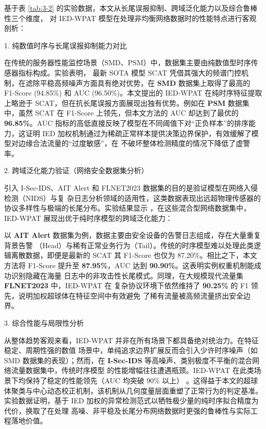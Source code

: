 基于表 \ref{tab:3-2} 的实验数据，本文从长尾误报抑制、跨域泛化能力以及综合鲁棒性三个维度，
对 IED-WPAT 模型在处理非均衡网络数据时的性能特点进行客观剖析：

1. 纯数值时序与长尾误报抑制能力对比

在传统的服务器性能监控场景（SMD、PSM）中，数据集主要由纯数值型时序传感器指标构成。实验表明，
最新 SOTA 模型 SCAT 凭借其强大的频谱门控机制，在滤除平稳高频噪声方面具有绝对优势，在 
\textbf{SMD} 数据集上取得了最高的 F1-Score (94.85\%) 和 AUC (96.50\%)。本文提出的 
IED-WPAT 在纯时序特征提取上略逊于 SCAT，但在抗长尾误报方面展现出独有优势。例如在
\textbf{PSM} 数据集中，虽然 SCAT 在 F1-Score 上领先，但本文方法的 AUC 却达到了最优的 
\textbf{96.85\%}。AUC 指标的高低直接反映了模型在不同阈值下对“正负样本”的排序能力，这证明 
IED 加权机制通过为稀疏正常样本提供决策边界保护，有效缓解了模型对边缘合法流量的“过度敏感”，在
不破坏整体检测精度的情况下降低了虚警率。

2. 跨域泛化能力验证（网络安全数据集分析）

引入 I-Sec-IDS、AIT Alert 和 FLNET2023 数据集的目的是验证模型在网络入侵检测（NIDS）与复
杂日志分析领域的适用性，这类数据表现出远超物理传感器的协议多样性与极端的长尾分布。实验结果显示
，在这些混合型网络数据集中，IED-WPAT 展现出优于纯时序模型的跨域泛化能力：

以 \textbf{AIT Alert} 数据集为例，数据主要由安全设备的告警日志组成，存在大量重复背景告警
（Head）与稀有正常业务行为（Tail）。传统的时序模型难以处理此类逻辑离散数据，即便是最新的 
SCAT 其 F1-Score 也仅为 87.20\%。相比之下，本文方法将 F1-Score 提升至 
\textbf{87.95\%}，AUC 达到 \textbf{90.90\%}。这表明实例权重机制能成功识别隐藏在海量
日志中的非攻击性长尾模式。同理，在大规模现代流量集 \textbf{FLNET2023} 中，IED-WPAT 在
复杂协议环境下依然维持了 \textbf{90.25\%} 的 F1 领先，说明加权超球体在特征空间中有效避免
了稀有流量被高频流量挤出安全边界。

3. 综合性能与局限性分析

从整体趋势客观来看，IED-WPAT 并非在所有场景下都具备绝对统治力。在特征稳定、周期性强的数值
场景中，单纯追求边界扩展反而会引入少许时序噪声（如 SMD 数据集的表现）；然而，在 
\textbf{I-Sec-IDS} 等高噪声、类别极度不平衡的混合网络流量数据集中，传统时序模型
的性能增幅往往遭遇瓶颈。IED-WPAT 在此类场景下均保持了稳定的性能领先（AUC 均突破 90\% 以上）
。这得益于本文的超球体聚类与中心动态校正机制，该机制从几何度量层面重塑了正常行为的判定基准。
实验数据证明，基于 IED 加权的异常检测范式以牺牲极少量的纯时序拟合精度为代价，换取了在处理
高噪、非平稳及长尾分布网络数据时更强的鲁棒性与实际工程落地价值。


